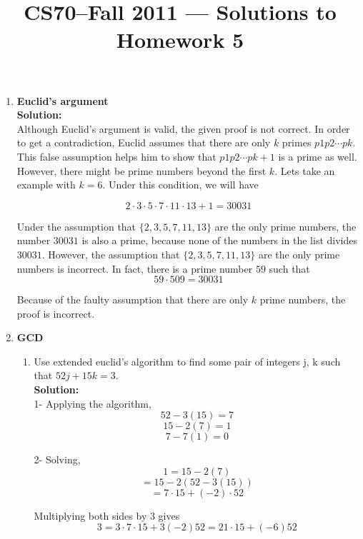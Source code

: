 \documentclass[11pt]{article}
\title{CS70--Fall 2011 --- Solutions to Homework 5}
\date{}
\begin{document}
	\maketitle
	
	\begin{enumerate}
		
		\item \textbf{Euclid's argument} \\
		\textbf{Solution: } \\ Although Euclid's argument is valid, the given proof is not correct. In order to get a contradiction, Euclid assumes that there are only $k$ primes $p1 p2 \cdots pk$. This false assumption helps him to show that $p1 p2 \cdots pk + 1$ is a prime as well. However, there might be prime numbers beyond the first $k$. Lets take an example with $k = 6$. Under this condition, we will have 
		
		$$2 \cdot 3 \cdot 5 \cdot 7 \cdot 11 \cdot 13 + 1 = 30031$$
		
		Under the assumption that $\{2, 3, 5, 7, 11, 13\}$ are the only prime numbers, the number $30031$ is also a prime, because none of the numbers in the list divides $30031$. However, the assumption that $\{2, 3, 5, 7, 11, 13\}$ are the only prime numbers is incorrect. In fact, there is a prime number $59$ such that 
					$$59 \cdot 509 = 30031$$ 
		
		Because of the faulty assumption that there are only $k$ prime numbers, the proof is incorrect. 
		
		\item \textbf{GCD}
			\begin{enumerate}
				\item Use extended euclid’s algorithm to find some pair of integers j, k such that $52 j + 15k = 3$. \\
				\textbf{Solution: } \\
				1- Applying the algorithm, 
							$$52 - 3(15) = 7$$
							$$15 - 2(7) = 1$$
							$$7 - 7(1) = 0$$
				
				2- Solving, 
							$$1 = 15 - 2(7)$$
							$$= 15 - 2(52 - 3(15))$$
							$$= 7 \cdot 15+(-2) \cdot 52$$
				
				Multiplying both sides by $3$ gives 
				$$3 = 3 \cdot 7 \cdot 15 + 3(-2)52 = 21 \cdot 15+(-6)52$$
				

\end{enumerate}
\end{enumerate}
\end{document}
